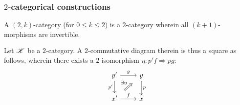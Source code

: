         \subsubsection{\texorpdfstring{$2$}{}-categorical constructions}
            \begin{definition} \label{def: 2_categories_and_2_functors}
                
            \end{definition}
            \begin{definition}[$(2, k)$-categories] \label{def: (2, k)_categories} 
                A $(2, k)$-category (for $0 \leq k \leq 2$) is a $2$-category wherein all $(k + 1)$-morphisms are invertible.
            \end{definition}
            \begin{definition} \label{def: 2_natural_transformations}
                
            \end{definition}
            \begin{definition} \label{def: natural_modifications}
                
            \end{definition}
            \begin{remark} \label{remark: 2_categories_of_2_functors}
                
            \end{remark}
            
            \begin{definition} \label{def: 2_commutative_diagrams}
                Let $\mathscr{K}$ be a $2$-category. A $2$-commutative diagram therein is thus a square as follows, wherein there exists a $2$-isomorphism $\eta: p'f \Rightarrow pg$:
                    $$
                        \begin{tikzcd}
                        	{y'} & y \\
                        	{x'} & x
                        	\arrow["{p'}"', from=1-1, to=2-1]
                        	\arrow["f", from=2-1, to=2-2]
                        	\arrow["g", from=1-1, to=1-2]
                        	\arrow["p", from=1-2, to=2-2]
                        	\arrow["\exists \eta", shorten <=8pt, shorten >=8pt, Rightarrow, from=2-1, to=1-2]
                        \end{tikzcd}
                    $$
            \end{definition}
            
